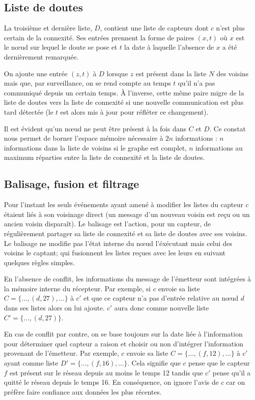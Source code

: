 \documentclass[10pt]{article}
\begin{document}
\begin{multicols}{2}
\subsection*{Liste de doutes}

La troisième et dernière liste, $D$, contient une liste de capteurs
dont $c$ n'est plus certain de la connexité. Ses entrées prennent la
forme de paires $(x,t)$ o\`u $x$ est le n\oe ud sur lequel le doute se
pose et $t$ la date à laquelle l'absence de $x$ a été dernièrement
remarquée.

On ajoute une entrée $(z,t)$ à $D$ lorsque $z$ est présent dans la
liste $N$ des voisins mais que, par surveillance, on se rend compte au
temps $t$ qu'il n'a pas communiqué depuis un certain temps. \`A
l'inverse, cette même paire migre de la liste de doutes vers la liste
de connexité si une nouvelle communication est plus tard détectée (le
$t$ est alors mis à jour pour réfléter ce changement).

Il est évident qu'un n\oe ud ne peut être présent à la fois dans $C$
et $D$. Ce constat nous permet de borner l'espace mémoire nécessaire à
$2n$ informations : $n$ informations dans la liste de voisins si le
graphe est complet, $n$ informations au maximum réparties entre la
liste de connexité et la liste de doutes.

\subsection*{Balisage, fusion et filtrage}

Pour l'instant les seuls événements ayant amené à modifier les listes
du capteur $c$ étaient liés à son voisinage direct (un message d'un
nouveau voisin est reçu ou un ancien voisin disparaît). Le balisage
est l'action, pour un capteur, de régulièrement partager sa liste de
connexité et sa liste de doutes avec ses voisins. Le balisage ne
modifie pas l'état interne du n\oe ud l'éxécutant mais celui des
voisins le captant; qui fusionnent les listes reçues avec les leurs en
suivant quelques règles simples.

En l'absence de conflit, les informations du message de l'émetteur
sont intégrées à la mémoire interne du récepteur. Par exemple, si $c$
envoie sa liste $C = \{\dots,(d,27),\dots\}$ à $c'$ et que ce
capteur n'a pas d'entrée relative au n\oe ud $d$ dans ses listes alors
on lui ajoute. $c'$ aura donc comme nouvelle liste $C' =
\{\dots,(d,27)\}$.

En cas de conflit par contre, on se base toujours sur la date liée à
l'information pour déterminer quel capteur a raison et choisir ou non
d'intégrer l'information provenant de l'émetteur. Par exemple, $c$
envoie sa liste $C = \{\dots,(f,12),\dots\}$ à $c'$ ayant comme liste
$D' = \{\dots,(f,16),\dots\}$. Cela signifie que $c$ pense que le
capteur $f$ est présent sur le réseau depuis au moins le temps 12
tandis que $c'$ pense qu'il a quitté le réseau depuis le temps 16. En
conséquence, on ignore l'avis de $c$ car on préfère faire confiance
aux données les plus récentes.


\end{multicols}
\end{document}
